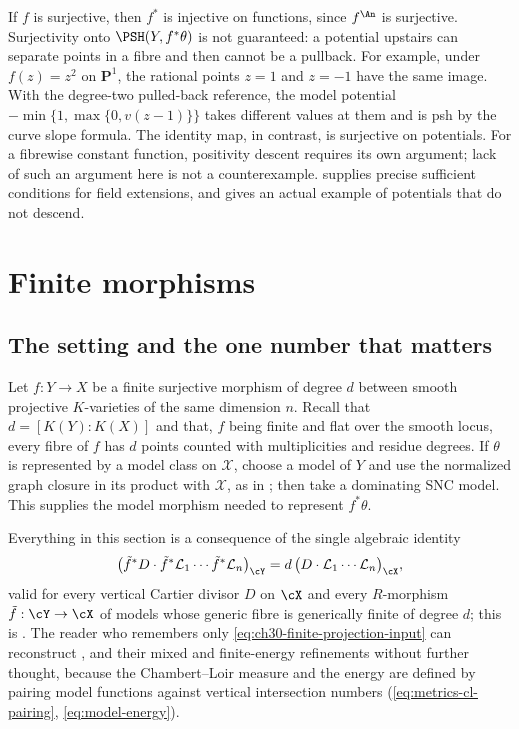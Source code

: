 \begin{remark}
\label{rem:ch30-pullback-not-onto}
If $f$ is surjective, then $f^*$ is injective on functions, since
$f^{\An}$ is surjective.  Surjectivity onto $\PSH(Y,f^*\theta)$ is not guaranteed: a potential
upstairs can separate points in a fibre and then cannot be a pullback.
For example, under $f(z)=z^2$ on $\mathbf P^1$, the rational points
$z=1$ and $z=-1$ have the same image.  With the degree-two pulled-back
reference, the model potential
$-\min\{1,\max\{0,v(z-1)\}\}$ takes different values at them and is
psh by the curve slope formula.  The identity map, in contrast, is
surjective on potentials.
For a fibrewise constant function, positivity descent requires its own
argument; lack of such an argument here is not a counterexample.
 supplies precise sufficient conditions for field
extensions, and  gives an actual example of
potentials that do not descend.
\end{remark}

\section{Finite morphisms}
\label{sec:ch30-finite}

\subsection{The setting and the one number that matters}
\label{sec:ch30-finite-setting}

Let $f:Y\to X$ be a finite surjective morphism of degree $d$ between
smooth projective $K$-varieties of the same dimension $n$.  Recall that
$d=[K(Y):K(X)]$ and that, $f$ being finite and flat over the smooth
locus, every fibre of $f$ has $d$ points counted with multiplicities and
residue degrees.  If $\theta$ is represented by a model class on $\mathcal X$, choose
a model of $Y$ and use the normalized graph closure in its product with
$\mathcal X$, as in ; then take a
dominating SNC model.  This supplies the model morphism needed to
represent $f^*\theta$.

Everything in this section is a consequence of the single algebraic identity
\begin{equation}
\label{eq:ch30-finite-projection-input}
 \bigl(\tilde f^*D\cdot\tilde f^*\mathcal L_1\cdots
       \tilde f^*\mathcal L_n\bigr)_{\cY}
 =d\,\bigl(D\cdot\mathcal L_1\cdots\mathcal L_n\bigr)_{\cX},
\end{equation}
valid for every vertical Cartier divisor $D$ on $\cX$ and every
$R$-morphism $\tilde f:\cY\to\cX$ of models whose generic fibre is
generically finite of degree $d$; this is
.  The reader who remembers only
\eqref{eq:ch30-finite-projection-input} can reconstruct
,  and their
mixed and finite-energy refinements without further thought, because the
Chambert--Loir measure and the energy are defined by pairing model functions
against vertical intersection numbers
(\eqref{eq:metrics-cl-pairing}, \eqref{eq:model-energy}).

